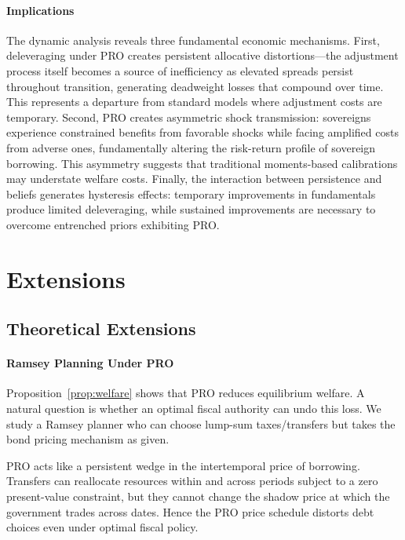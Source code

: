 \documentclass[12pt]{article}
\theoremstyle{plain}
\begin{document}
\paragraph{Implications}

The dynamic analysis reveals three fundamental economic mechanisms. First,
deleveraging under PRO creates persistent allocative distortions—the adjustment
process itself becomes a source of inefficiency as elevated spreads persist
throughout transition, generating deadweight losses that compound over time.
This represents a departure from standard models where adjustment costs are
temporary. Second, PRO creates asymmetric shock transmission: sovereigns
experience constrained benefits from favorable shocks while facing amplified
costs from adverse ones, fundamentally altering the risk-return profile of
sovereign borrowing. This asymmetry suggests that traditional moments-based
calibrations may understate welfare costs. Finally, the interaction between
persistence and beliefs generates hysteresis effects: temporary improvements in
fundamentals produce limited deleveraging, while sustained improvements are
necessary to overcome entrenched priors exhibiting PRO.

\section{Extensions}

\subsection{Theoretical Extensions}\label{sec:extensions}

\paragraph{Ramsey Planning Under PRO}\label{sec:ramsey}
Proposition~\ref{prop:welfare} shows that PRO reduces equilibrium welfare. A
natural question is whether an optimal fiscal authority can undo this loss. We
study a Ramsey planner who can choose lump-sum taxes/transfers but takes the
bond pricing mechanism as given.

PRO acts like a persistent wedge in the intertemporal price of borrowing.
Transfers can reallocate resources within and across periods subject to a zero
present-value constraint, but they cannot change the shadow price at which the
government trades across dates. Hence the PRO price schedule distorts debt
choices even under optimal fiscal policy.
\end{document}
